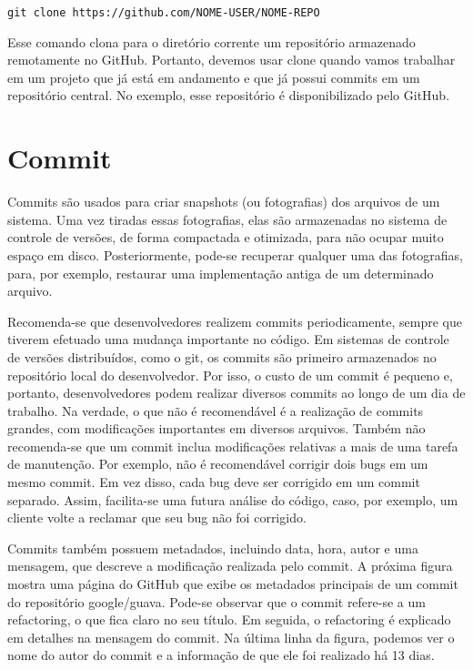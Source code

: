 \documentclass[
  11pt,
  twoside]{book}
\newcommand{\passthrough}[1]{#1}
\begin{document}
\passthrough{\lstinline!git clone https://github.com/NOME-USER/NOME-REPO!}

Esse comando clona para o diretório corrente um repositório armazenado
remotamente no GitHub. Portanto, devemos usar clone quando vamos
trabalhar em um projeto que já está em andamento e que já possui commits
em um repositório central. No exemplo, esse repositório é
disponibilizado pelo GitHub.

\hypertarget{commit}{%
\section{Commit}\label{commit}}


Commits são usados para criar snapshots (ou fotografias) dos arquivos de
um sistema. Uma vez tiradas essas fotografias, elas são armazenadas no
sistema de controle de versões, de forma compactada e otimizada, para
não ocupar muito espaço em disco. Posteriormente, pode-se recuperar
qualquer uma das fotografias, para, por exemplo, restaurar uma
implementação antiga de um determinado arquivo.

Recomenda-se que desenvolvedores realizem commits periodicamente, sempre
que tiverem efetuado uma mudança importante no código. Em sistemas de
controle de versões distribuídos, como o git, os commits são primeiro
armazenados no repositório local do desenvolvedor. Por isso, o custo de
um commit é pequeno e, portanto, desenvolvedores podem realizar diversos
commits ao longo de um dia de trabalho. Na verdade, o que não é
recomendável é a realização de commits grandes, com modificações
importantes em diversos arquivos. Também não recomenda-se que um commit
inclua modificações relativas a mais de uma tarefa de manutenção. Por
exemplo, não é recomendável corrigir dois bugs em um mesmo commit. Em
vez disso, cada bug deve ser corrigido em um commit separado. Assim,
facilita-se uma futura análise do código, caso, por exemplo, um cliente
volte a reclamar que seu bug não foi corrigido.

Commits também possuem metadados, incluindo data, hora, autor e uma
mensagem, que descreve a modificação realizada pelo commit. A próxima
figura mostra uma página do GitHub que exibe os metadados principais de
um commit do repositório google/guava. Pode-se observar que o commit
refere-se a um refactoring, o que fica claro no seu título. Em seguida,
o refactoring é explicado em detalhes na mensagem do commit. Na última
linha da figura, podemos ver o nome do autor do commit e a informação de
que ele foi realizado há 13 dias.
\end{document}
